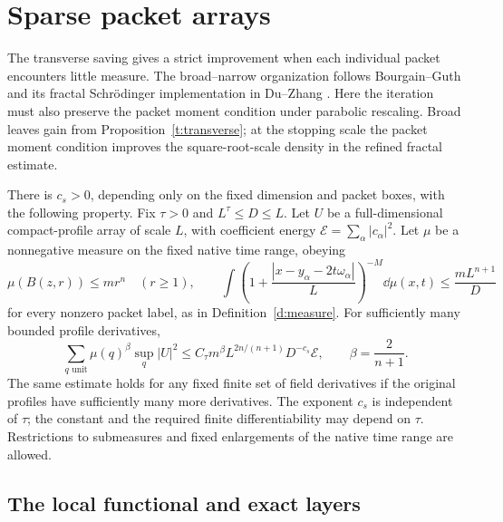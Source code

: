 \section{Sparse packet arrays}
\label{s:section}

The transverse saving gives a strict improvement when each individual
packet encounters little measure.  The broad--narrow organization follows
Bourgain--Guth \citep[Section~2]{BourgainGuth2011} and its fractal
Schr\"odinger implementation in Du--Zhang \citep[Section~3]{DuZhang2019}.
Here the iteration must also preserve the packet moment condition under
parabolic rescaling.  Broad leaves gain from
Proposition~\ref{t:transverse}; at the stopping scale the packet moment
condition improves the square-root-scale density in the refined fractal
estimate.

\begin{proposition}\label{s:sparse}
There is $c_s>0$, depending only on the fixed dimension and packet
boxes, with the following property.  Fix $\tau>0$ and
$L^\tau\le D\le L$.  Let $U$ be a full-dimensional compact-profile
array of scale $L$, with coefficient energy
$\mathcal E=\sum_\alpha|c_\alpha|^2$.  Let $\mu$ be a nonnegative
measure on the fixed native time range, obeying
\[
 \mu(B(z,r))\le mr^n\quad(r\ge1),\qquad
 \int\left(1+\frac{|x-y_\alpha-2t\omega_\alpha|}{L}\right)^{-M}
          \dd\mu(x,t)\le\frac{mL^{n+1}}D
\]
for every nonzero packet label, as in Definition~\ref{d:measure}.
For sufficiently many bounded profile derivatives,
\begin{equation}\label{s:estimate}
 \sum_{q\text{ unit}}\mu(q)^\beta\sup_q|U|^2
       \le C_\tau m^\beta L^{2n/(n+1)}D^{-c_s}\mathcal E,
       \qquad \beta=\frac2{n+1}.
\end{equation}
The same estimate holds for any fixed finite set of field derivatives
if the original profiles have sufficiently many more derivatives.
The exponent $c_s$ is independent of $\tau$; the constant and the
required finite differentiability may depend on $\tau$.  Restrictions
to submeasures and fixed enlargements of the native time range are
allowed.
\end{proposition}

\subsection{The local functional and exact layers}

